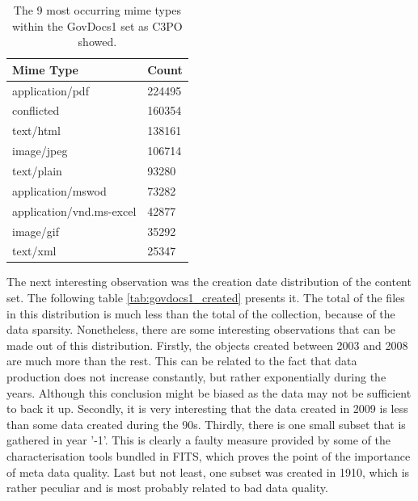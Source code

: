 
\begin{table}[h]
\centering
\begin{tabular}{l || l }
\hline
Mime Type & Count \\
\hline
\hline
 application/pdf & 224495 \\
 conflicted 	& 160354 \\
 text/html		&  138161 \\
 image/jpeg	&  106714 \\
 text/plain		& 93280 \\
 application/mswod & 73282 \\
 application/vnd.ms-excel & 42877 \\
 image/gif		& 35292 \\
 text/xml		& 25347\\
 \hline
\end{tabular}
\caption{The 9 most occurring mime types within the GovDocs1 set as C3PO showed.}
\label{tab:govdocs1_mimetypes}
\end{table}

The next interesting observation was the creation date distribution of the content set.
The following table \ref{tab:govdocs1_created} presents it.
The total of the files in this distribution is much less than the total of the collection, because of the data sparsity.
Nonetheless, there are some interesting observations that can be made out of this distribution.
Firstly, the objects created between 2003 and 2008 are much more than the rest.
This can be related to the fact that data production does not increase constantly, but rather exponentially during the years.
Although this conclusion might be biased as the data may not be sufficient to back it up.
Secondly, it is very interesting that the data created in 2009 is  less than some data created during the 90s.
Thirdly, there is one small subset that is gathered in year '-1'.
This is clearly a faulty measure provided by some of the characterisation tools bundled in FITS, which proves the point of the importance of meta data quality.
Last but not least, one subset was created in 1910, which is rather peculiar and is most probably related to bad data quality.

